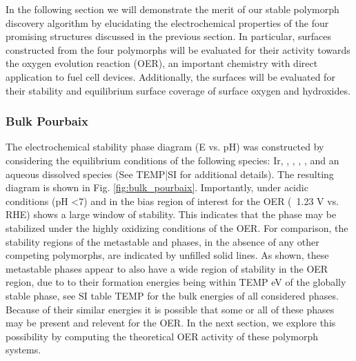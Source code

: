 

In the following section we will demonstrate the merit of our stable polymorph discovery algorithm by elucidating the electrochemical properties of the four promising structures discussed in the previous section.
In particular, surfaces constructed from the four polymorphs will be evaluated for their activity towards the oxygen evolution reaction (OER), an important chemistry with direct application to fuel cell devices.
Additionally, the surfaces will be evaluated for their stability and equilibrium surface coverage of surface oxygen and hydroxides.

\subsubsection{Bulk Pourbaix}

The electrochemical stability phase diagram (E vs. pH) was constructed by considering the equilibrium conditions of the following species: Ir, \rIrOtwo, \aIrOthree,  \rIrOthree, \bIrOthree, and an aqueous dissolved  species (See TEMP|SI for additional details).
The resulting diagram is shown in Fig. \ref{fig:bulk_pourbaix}.
Importantly, under acidic conditions (pH \textless 7) and in the bias region of interest for the OER (~1.23 V vs. RHE) \aIrOthree shows a large window of stability.
This indicates that the \aIrOthree phase may be stabilized under the highly oxidizing conditions of the OER.
For comparison, the stability regions of the metastable \rIrOthree and \bIrOthree phases, in the absence of any other competing  polymorphs, are indicated by unfilled solid lines.
As shown, these metastable phases appear to also have a wide region of stability in the OER region,
due to to their formation energies being within TEMP eV of the globally stable \aIrOthree phase, see SI table TEMP for the bulk energies of all considered phases.
Because of their similar energies it is possible that some or all of these  phases may be present and relevent for the OER.
In the next section, we explore this possibility by computing the theoretical OER activity of these polymorph systems.

